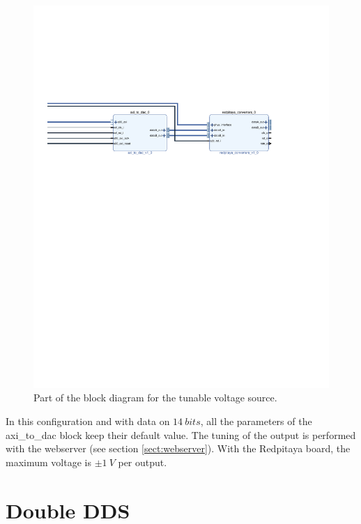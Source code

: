 \documentclass[12pt,oneside]{article}
\begin{document}
\begin{figure}[h!tb]
	\begin{center}
		\includegraphics[width=12cm,trim={4.5cm 16cm 3.5cm 7cm}, clip]{figures/GeneTension.pdf}
		\caption{Part of the block diagram for the tunable voltage source.}
		\label{fig:geneTension}
	\end{center}
\end{figure}
\vspace{3cm}
In this configuration and with data on $14~bits$, all the parameters of the axi\_to\_dac block keep their default value. The tuning of the output is performed with the webserver (see section \ref{sect:webserver}). With the Redpitaya board, the maximum voltage is $\pm 1~V$ per output.
\vspace{1cm}
\section{Double DDS}
\end{document}
